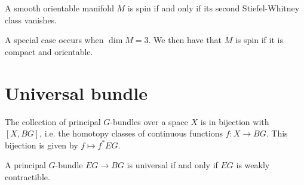 	\begin{property}
		A smooth orientable manifold $M$ is spin if and only if its second Stiefel-Whitney class vanishes.
	\end{property}
	\begin{property}
		A special case occurs when $\dim M = 3$. We then have that $M$ is spin if it is compact and orientable.
	\end{property}
	
	
\section{Universal bundle}

	
	\begin{property}
		The collection of principal $G$-bundles over a space $X$ is in bijection with $[X, BG]$, i.e. the homotopy classes of continuous functions $f:X\rightarrow BG$. This bijection is given by $f\mapsto f^*EG$.
	\end{property}
	
	\begin{property}
		A principal $G$-bundle $EG\rightarrow BG$ is universal if and only if $EG$ is weakly contractible.
	\end{property}
